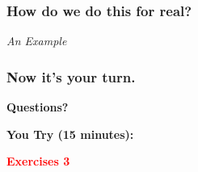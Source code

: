 \documentclass{beamer}
\begin{document}
\begin{frame}
\frametitle{How do we do this for real?}
\begin{center} 
\textit{An Example}

\end{center}
\end{frame}

\begin{frame}
\frametitle{Now it's your turn.}
\begin{center} 

\textbf{Questions?}
\vspace{20pt}
\pause

\textbf{You Try (15 minutes):}

\textbf{\textcolor{red}{Exercises 3}}
\end{center}
\end{frame}
\end{document}
